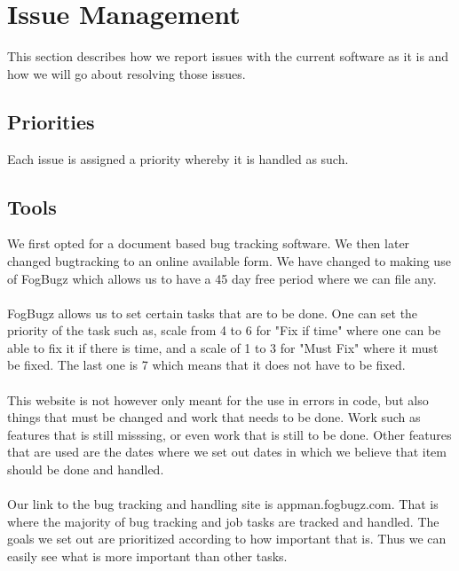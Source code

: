 \documentclass[a4paper,12pt,final]{article}
\begin{document}
\newpage
\section{Issue Management}
This section describes how we report issues with the current software as it is and how we will go about resolving those issues. 
\subsection{Priorities}
Each issue is assigned a priority whereby it is handled as such. 
\subsection{Tools}
We first opted for a document based bug tracking software. We then later changed bugtracking to an online available form. We have changed to making use of FogBugz which allows us to have a 45 day free period where we can file any.\\
\textbf{\\}
FogBugz allows us to set certain tasks that are to be done. One can set the priority of the task such as, scale from 4 to 6 for "Fix if time" where one can be able to fix it if there is time, and a scale of 1 to 3 for "Must Fix" where it must be fixed. The last one is 7 which means that it does not have to be fixed.\\
\textbf{\\}
This website is not however only meant for the use in errors in code, but also things that must be changed and work that needs to be done. Work such as features that is still misssing, or even work that is still to be done. Other features that are used are the dates where we set out dates in which we believe that item should be done and handled.\\
\textbf{\\}
Our link to the bug tracking and handling site is appman.fogbugz.com. That is where the majority of bug tracking and job tasks are tracked and handled. The goals we set out are prioritized according to how important that is. Thus we can easily see what is more important than other tasks. 

\newpage
\end{document}
